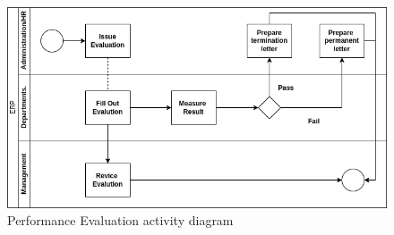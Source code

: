 \begin{figure}[!h]
\label{loan_activity_diagram}
\center
\includegraphics[width=15cm,keepaspectratio]{activity_diagrams/appraisal_activity_diagram.drawio.png}
\caption{Performance Evaluation activity diagram}
\end{figure}